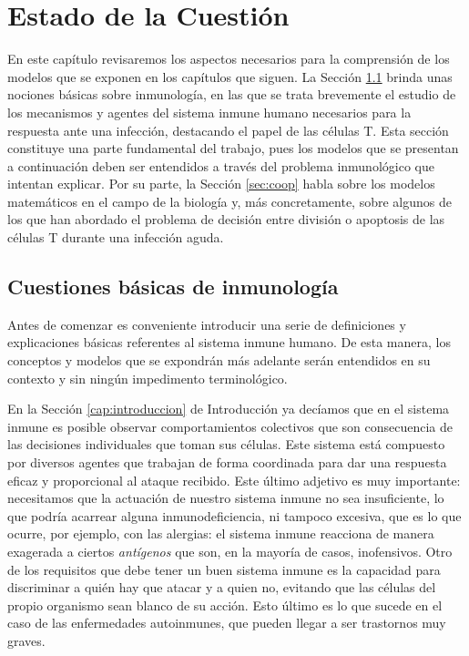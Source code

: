 \chapter{Estado de la Cuestión}
\label{cap:estadoDeLaCuestion}


En este capítulo revisaremos los aspectos necesarios para la comprensión de los modelos que se exponen en los capítulos que siguen. La Sección \ref{sec:cuestInmuno} brinda unas nociones básicas sobre inmunología, en las que se trata brevemente el estudio de los mecanismos y agentes del sistema inmune humano necesarios para la respuesta ante una infección, destacando el papel de las células T. Esta sección constituye una parte fundamental del trabajo, pues los modelos que se presentan a continuación deben ser entendidos a través del problema inmunológico que intentan explicar. Por su parte, la Sección \ref{sec:coop} habla sobre los modelos matemáticos en el campo de la biología y, más concretamente, sobre algunos de los que han abordado el problema de decisión entre división o apoptosis de las células T durante una infección aguda. 


\section{Cuestiones básicas de inmunología}
\label{sec:cuestInmuno}

Antes de comenzar es conveniente introducir una serie de definiciones y explicaciones básicas referentes al sistema inmune humano. De esta manera, los conceptos y modelos que se expondrán más adelante serán entendidos en su contexto y sin ningún impedimento terminológico. %

En la Sección \ref{cap:introduccion} de Introducción ya decíamos que en el sistema inmune es posible observar comportamientos colectivos que son consecuencia de las decisiones individuales que toman sus células. Este sistema está compuesto por diversos agentes que trabajan de forma coordinada para dar una respuesta eficaz y proporcional al ataque recibido. Este último adjetivo es muy importante: necesitamos que la actuación de nuestro sistema inmune no sea insuficiente, lo que podría acarrear alguna inmunodeficiencia, ni tampoco excesiva, que es lo que ocurre, por ejemplo, con las alergias: el sistema inmune reacciona de manera exagerada a ciertos \textit{antígenos} que son, en la mayoría de casos, inofensivos. Otro de los requisitos que debe tener un buen sistema inmune es la capacidad para discriminar a quién hay que atacar y a quien no, evitando que las células del propio organismo sean blanco de su acción. Esto último es lo que sucede en el caso de las enfermedades autoinmunes, que pueden llegar a ser trastornos muy graves.

